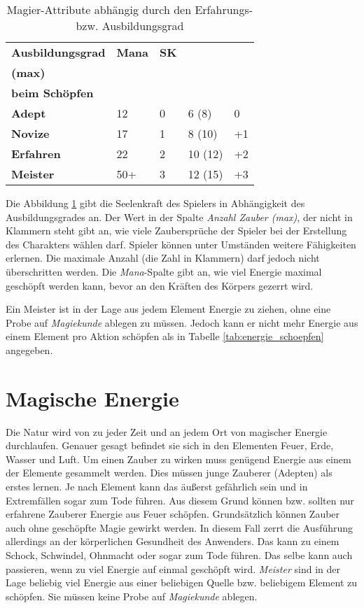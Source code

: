\begin{table}[H]
\begin{center}
\begin{tabular}{|l|l|l|l|l|}
\hline
\textbf{Ausbildungsgrad} & \textbf{Mana} & \textbf{SK} & \brcell{\textbf{Anzahl Zauber}\\\textbf{(max)}} & \brcell{\textbf{Erleichterung}\\\textbf{beim Schöpfen}} \\ \hline
\textbf{Adept} & 12 & 0 & 6 (8) & 0 \\ \hline
\textbf{Novize} & 17 & 1 & 8 (10) & +1 \\ \hline
\textbf{Erfahren} & 22 & 2 & 10 (12) & +2 \\ \hline
\textbf{Meister} & 50+ & 3 & 12 (15) & +3 \\ \hline
\end{tabular}
\end{center}
\caption{Magier-Attribute abhängig durch den Erfahrungs- bzw. Ausbildungsgrad}
\label{tab:magier-attribute}
\end{table}

Die Abbildung \ref{tab:magier-attribute} gibt die Seelenkraft des Spielers in Abhängigkeit des Ausbildungsgrades an. Der Wert in der Spalte \textit{Anzahl Zauber (max)}, der nicht in Klammern steht gibt an, wie viele Zaubersprüche der Spieler bei der Erstellung des Charakters wählen darf. Spieler können unter Umständen weitere Fähigkeiten erlernen. Die maximale Anzahl (die Zahl in Klammern) darf jedoch nicht überschritten werden. Die \textit{Mana}-Spalte gibt an, wie viel Energie maximal geschöpft werden kann, bevor an den Kräften des Körpers gezerrt wird.

Ein Meister ist in der Lage aus jedem Element Energie zu ziehen, ohne eine Probe auf \textit{Magiekunde} ablegen zu müssen. Jedoch kann er nicht mehr Energie aus einem Element pro Aktion schöpfen als in Tabelle \ref{tab:energie_schoepfen} angegeben.

\section{Magische Energie}
Die Natur wird von zu jeder Zeit und an jedem Ort von magischer Energie durchlaufen. Genauer gesagt befindet sie sich in den Elementen Feuer, Erde, Wasser und Luft. Um einen Zauber zu wirken muss genügend Energie aus einem der Elemente gesammelt werden. Dies müssen junge Zauberer (Adepten) als erstes lernen. Je nach Element kann das äußerst gefährlich sein und in Extremfällen sogar zum Tode führen. Aus diesem Grund können bzw. sollten nur erfahrene Zauberer Energie aus Feuer schöpfen. Grundsätzlich können Zauber auch ohne geschöpfte Magie gewirkt werden. In diesem Fall zerrt die Ausführung allerdings an der körperlichen Gesundheit des Anwenders. Das kann zu einem Schock, Schwindel, Ohnmacht oder sogar zum Tode führen. Das selbe kann auch passieren, wenn zu viel Energie auf einmal geschöpft wird. \textit{Meister} sind in der Lage beliebig viel Energie aus einer beliebigen Quelle bzw. beliebigem Element zu schöpfen. Sie müssen keine Probe auf \textit{Magiekunde} ablegen.

